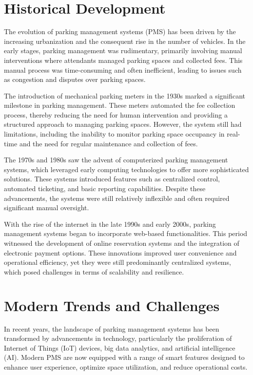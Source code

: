 \documentclass[oneside, 12pt, a4paper, draft]{book}
\begin{document}
\section{Historical Development}
\label{sec:org8feebdd}
The evolution of parking management systems (PMS) has been driven by the increasing urbanization and the consequent rise in the number of vehicles. In the early stages, parking management was rudimentary, primarily involving manual interventions where attendants managed parking spaces and collected fees. This manual process was time-consuming and often inefficient, leading to issues such as congestion and disputes over parking spaces.

The introduction of mechanical parking meters in the 1930s marked a significant milestone in parking management. These meters automated the fee collection process, thereby reducing the need for human intervention and providing a structured approach to managing parking spaces. However, the system still had limitations, including the inability to monitor parking space occupancy in real-time and the need for regular maintenance and collection of fees.

The 1970s and 1980s saw the advent of computerized parking management systems, which leveraged early computing technologies to offer more sophisticated solutions. These systems introduced features such as centralized control, automated ticketing, and basic reporting capabilities. Despite these advancements, the systems were still relatively inflexible and often required significant manual oversight.

With the rise of the internet in the late 1990s and early 2000s, parking management systems began to incorporate web-based functionalities. This period witnessed the development of online reservation systems and the integration of electronic payment options. These innovations improved user convenience and operational efficiency, yet they were still predominantly centralized systems, which posed challenges in terms of scalability and resilience.
\section{Modern Trends and Challenges}
\label{sec:org8c1a7ff}
In recent years, the landscape of parking management systems has been transformed by advancements in technology, particularly the proliferation of Internet of Things (IoT) devices, big data analytics, and artificial intelligence (AI). Modern PMS are now equipped with a range of smart features designed to enhance user experience, optimize space utilization, and reduce operational costs.
\end{document}
